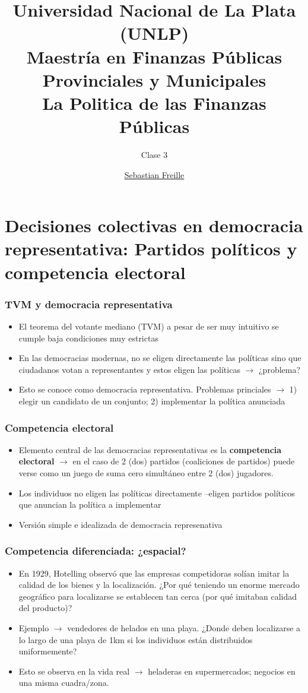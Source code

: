 \documentclass[14pt,aspectratio=169]{beamer}
\title{Universidad Nacional de La Plata (UNLP) \\ Maestría en Finanzas
  Públicas Provinciales y Municipales \\ La Politica de las Finanzas
  Públicas}
\subtitle{Clase 3}
\author{\underline{Sebastian Freille} \inst{1}}
\institute[IEF (FCE-UNC)]{\inst{1} Instituto de Economía y Finanzas (FCE-UNC)}
\date{}
\begin{document}
\maketitle



\section{Decisiones colectivas en democracia representativa: Partidos
  políticos y competencia electoral}


\begin{frame}\frametitle{TVM y democracia representativa}
\begin{itemize}
\item El teorema del votante mediano (TVM) a pesar de ser muy
  intuitivo se cumple baja condiciones muy estrictas
  \item En las democracias modernas, no se eligen directamente las
    políticas sino que ciudadanos votan a representantes y estos
    eligen las políticas $\longrightarrow$ ¿problema?
    \item Esto se conoce como democracia representativa. Problemas
      princiales $\longrightarrow$ 1) elegir un candidato de un
      conjunto; 2) implementar la política anunciada
\end{itemize}
\end{frame}



\begin{frame}\frametitle{Competencia electoral}
\begin{itemize}
\item Elemento central de las democracias representativas es la
  \textbf{competencia electoral} $\longrightarrow$ en el caso de 2
  (dos) partidos (coaliciones de partidos) puede verse como un juego de suma
  cero simultáneo entre 2 (dos) jugadores.
  \item Los individuos no eligen las políticas directamente --eligen
    partidos políticos que anuncian la política a implementar
    \item Versión simple e idealizada de democracia represenativa
\end{itemize}
\end{frame}


\begin{frame}\frametitle{Competencia diferenciada: ¿espacial?}
\begin{itemize}
\item En 1929, Hotelling observó que las empresas competidoras solían
  imitar la calidad de los bienes y la
  localización. ¿Por qué teniendo un enorme
  mercado geográfico para localizarse se establecen tan cerca (por qué
  imitaban calidad del producto)?
\item Ejemplo $\longrightarrow$ vendedores de helados en una
  playa. ¿Donde deben localizarse a lo largo de una playa de 1km si
  los individuos están distribuidos uniformemente?
  \item Esto se observa en la vida real
    $\longrightarrow$ heladeras en supermercados; negocios en una
    misma cuadra/zona.
\end{itemize}
\end{frame}
\end{document}
